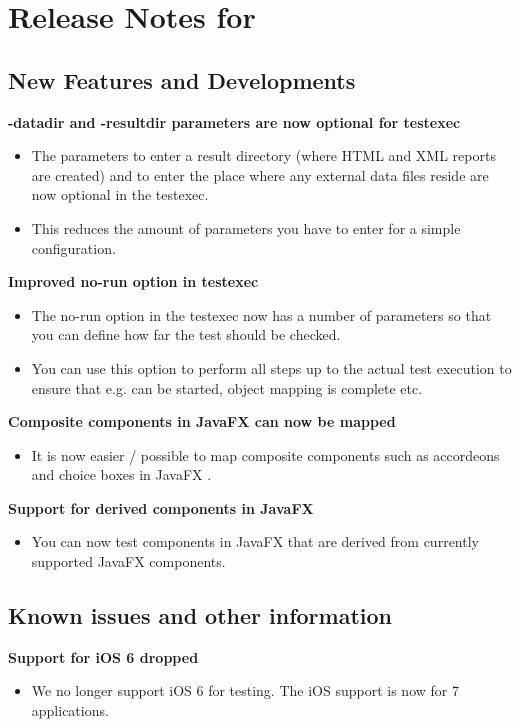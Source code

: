 \makeatletter
\section{Release Notes for \@bxversion}
\makeatother

\subsection{New Features and Developments}
\textbf{-datadir and -resultdir parameters are now optional for testexec}
\begin{itemize}
\item The parameters to enter a result directory (where HTML and XML reports are created) and to enter the place where any external data files reside are now optional in the testexec.
\item This reduces the amount of parameters you have to enter for a simple configuration.
\end{itemize}

\textbf{Improved no-run option in testexec}
\begin{itemize}
\item The no-run option in the testexec now has a number of parameters so that you can define how far the test should be checked. 
\item You can use this option to perform all steps up to the actual test execution to ensure that e.g. \gdauts{} can be started, object mapping is complete etc.
\end{itemize}

\textbf{Composite components in JavaFX can now be mapped}
\begin{itemize}
\item It is now easier / possible to map composite components such as accordeons and choice boxes in JavaFX \gdauts{}. 
\end{itemize}

\textbf{Support for derived components in JavaFX}
\begin{itemize}
\item You can now test components in JavaFX \gdauts{} that are derived from currently supported JavaFX components. 
\end{itemize}

\subsection{Known issues and other information}
\textbf{Support for iOS 6 dropped}
\begin{itemize}
\item We no longer support iOS 6 for testing. The iOS support is now for 7 applications. 
\end{itemize}
